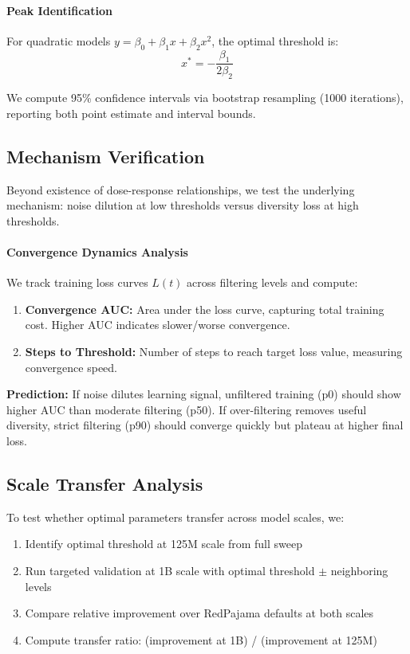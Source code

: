 \paragraph{Peak Identification}
For quadratic models $y = \beta_0 + \beta_1 x + \beta_2 x^2$, the optimal threshold is:
\begin{equation}
x^* = -\frac{\beta_1}{2\beta_2}
\end{equation}

We compute 95\% confidence intervals via bootstrap resampling (1000 iterations), reporting both point estimate and interval bounds.

\subsection{Mechanism Verification}

Beyond existence of dose-response relationships, we test the underlying mechanism: noise dilution at low thresholds versus diversity loss at high thresholds.

\paragraph{Convergence Dynamics Analysis}
We track training loss curves $L(t)$ across filtering levels and compute:
\begin{enumerate}
    \item \textbf{Convergence AUC:} Area under the loss curve, capturing total training cost. Higher AUC indicates slower/worse convergence.
    \item \textbf{Steps to Threshold:} Number of steps to reach target loss value, measuring convergence speed.
\end{enumerate}

\textbf{Prediction:} If noise dilutes learning signal, unfiltered training (p0) should show higher AUC than moderate filtering (p50). If over-filtering removes useful diversity, strict filtering (p90) should converge quickly but plateau at higher final loss.

\subsection{Scale Transfer Analysis}

To test whether optimal parameters transfer across model scales, we:
\begin{enumerate}
    \item Identify optimal threshold at 125M scale from full sweep
    \item Run targeted validation at 1B scale with optimal threshold $\pm$ neighboring levels
    \item Compare relative improvement over RedPajama defaults at both scales
    \item Compute transfer ratio: (improvement at 1B) / (improvement at 125M)
\end{enumerate}

